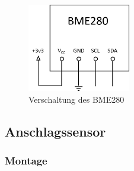 \begin{figure}[H]
  \centering
  \includegraphics[width=0.4\textwidth]{./img/BME280_Plan.png}
  \caption{Verschaltung des BME280}\label{fig:BME280_Plan}
\end{figure}

\subsection{Anschlagssensor}

\subsubsection{Montage}


